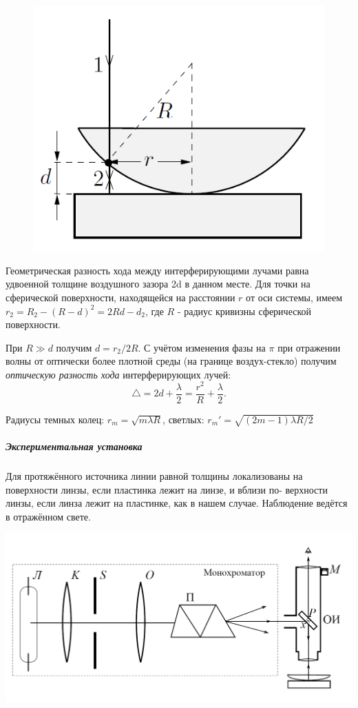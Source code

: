 \documentclass[12pt]{article}
\begin{document}
		
		\begin{figure}
			\includegraphics[scale=0.5]{rings}
		\end{figure}	
		Геометрическая разность хода между интерферирующими лучами
		равна удвоенной толщине воздушного зазора 2d в данном месте.
		Для точки на сферической поверхности, находящейся на расстоянии $r$ от оси системы, имеем $r_2 
		= R_2 - 
		(R - d)^2 
		= 2Rd -
		 d_2$,
		где $R$ - радиус кривизны сферической поверхности.
		
		При $R \gg d$ получим $d = r_2/2R$. С учётом изменения фазы на $\pi$ при отражении
		волны от оптически более плотной среды
		(на границе воздух-стекло) получим \textit{оптическую разность хода} интерферирующих лучей:
		\begin{equation}
		\triangle = 2d + \dfrac{\lambda}{2} = \dfrac{r^2}{R} + \dfrac{\lambda}{2}.
		\end{equation}
		
		Радиусы темных колец: $r_m = \sqrt{m\lambda R}$, светлых: $r_m' = \sqrt{(2m-1)\lambda R/2}$
		
		\subparagraph{Экспериментальная установка}
		
		Для протяжённого источника линии равной толщины локализованы
		на поверхности линзы, если пластинка лежит на линзе, и вблизи по-
		верхности линзы, если линза лежит на пластинке, как в нашем случае.
		Наблюдение ведётся в отражённом свете.
		
		
		
			\includegraphics[scale = 0.5]{equipment}
		
\end{document}
